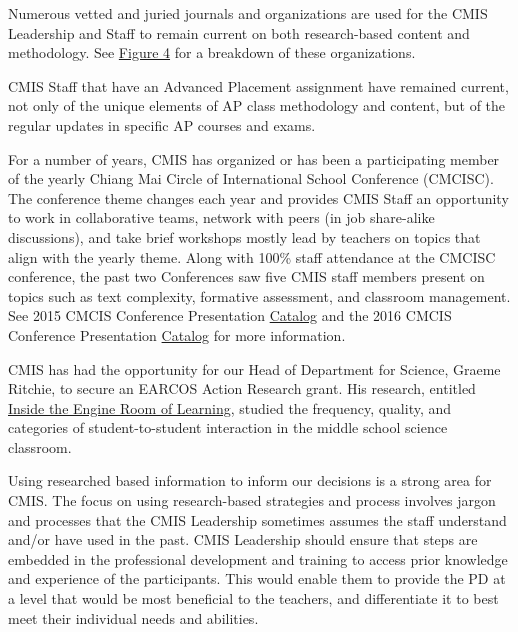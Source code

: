 \begin{findings}

Numerous vetted and juried journals and organizations are used for the CMIS Leadership and Staff to remain current on both research-based content and methodology. See \href{https://docs.google.com/a/cmis.ac.th/document/d/1xIQ3-59L8c4iTP9yB2HinT_vkMM5EzrZw17NmjZSzOE/edit?usp=sharing}{Figure 4} for a breakdown of these organizations. 

CMIS Staff that have an Advanced Placement assignment have remained current, not only of the unique elements of AP class methodology and content, but of the regular updates in specific AP courses and exams. 


For a number of years, CMIS has organized or has been a participating member of the yearly Chiang Mai Circle of International School Conference (CMCISC). The conference  theme changes each year and provides CMIS Staff an opportunity to work in collaborative teams, network with peers (in job share-alike discussions), and take brief workshops mostly lead by teachers on topics that align with the yearly theme. Along with 100\% staff attendance at the CMCISC conference, the past two Conferences saw five CMIS staff members present on topics such as text complexity, formative assessment, and classroom management. See 2015 CMCIS Conference Presentation \href{https://docs.google.com/document/d/1dFBXhPjlnErh-Sd2tAF0o2A8gXC37B4h2dEWAnCKhOY/edit?usp=sharing}{Catalog} and the 2016 CMCIS Conference Presentation \href{https://docs.google.com/document/d/1mT0c3_-WV7xRc-BbgpTU6cae63VlS3sN9sr-8q1Lid0/edit?usp=sharing}{Catalog} for more information. 

CMIS has had the opportunity for our Head of Department for Science, Graeme Ritchie, to secure an EARCOS Action Research grant. His research, entitled \href{https://drive.google.com/file/d/0B7TDqZfXoqRrLThkSjg0MFRvWkk/view?usp=sharing}{Inside the Engine Room of Learning}, studied the frequency, quality, and categories of student-to-student interaction in the middle school science classroom.  


Using researched based information to inform our decisions is a strong area for CMIS. The focus on using research-based strategies and process  involves jargon and processes that the CMIS Leadership sometimes assumes the staff understand and/or have used in the past. CMIS Leadership should ensure that steps are embedded in the professional development and training to access prior knowledge and experience of the participants. This would enable them to provide the PD at a level that would be most beneficial to the teachers, and differentiate it to best meet their individual needs and abilities.
\end{findings}

